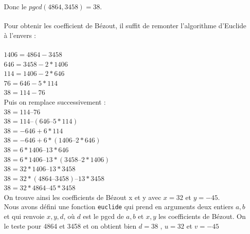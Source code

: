 \documentclass{article}
\begin{document}
Donc le $pgcd(4864,3458) = 38$.
\\
\\
Pour obtenir les coefficient de Bézout, il suffit de remonter l'algorithme d'Euclide à l'envers :\\
\\
$1406 = 4864 - 3458$\\
$646  = 3458 - 2 * 1406$\\
$114  = 1406 - 2 * 646 $\\
$76   = 646  - 5 * 114$\\
$38   = 114  - 76$\\

Puis on remplace successivement :\\
	$38 = 114 – 76$ \\
	$38 = 114 – (646 – 5*114)$ \\
	$38 = - 646 + 6 * 114$\\
	$38 = -646 + 6 * (1406 – 2 * 646)$\\
	$38 = 6 * 1406 – 13 * 646$\\
	$38 = 6 * 1406 – 13 * (3458 – 2 * 1406)$\\
	$38 = 32 * 1406 – 13 * 3458$\\
	$38 = 32 * (4864 – 3458) – 13 * 3458$\\
	$38 = 32 * 4864 – 45 * 3458$\\
On trouve ainsi les coefficients de Bézout x et y avec $x = 32$ et $y = -45$.
\\

Nous avons défini une fonction \texttt{euclide} qui prend en arguments deux entiers $a, b$ et qui renvoie $x, y, d$, où $d$ est le pgcd de $a, b$ et $x, y$ les coefficients de Bézout.
On le teste pour 4864 et 3458 et on obtient bien $d = 38$ , $u = 32$ et $v = -45$
\end{document}

